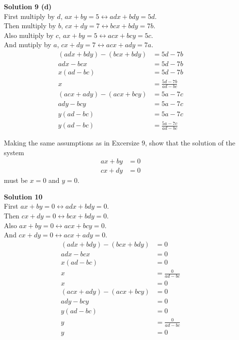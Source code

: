\textbf{Solution 9 (d)} \\
First multiply by $d$, $ax + by = 5 \leftrightarrow adx + bdy = 5d$. \\
Then multiply by $b$, $cx + dy = 7 \leftrightarrow bcx + bdy = 7b$. \\
Also multiply by $c$, $ax + by = 5 \leftrightarrow acx + bcy = 5c$. \\
And mutiply by $a$, $cx + dy  = 7 \leftrightarrow acx + ady = 7a$. 
\begin{align*}
    (adx + bdy) - (bcx + bdy) &= 5d - 7b && \\
    adx - bcx &= 5d - 7b && \\
    x(ad - bc) &= 5d - 7b && \\
    x &= \frac{5d - 7b}{ad - bc}
\end{align*}
\begin{align*}
    (acx + ady) - (acx + bcy) &= 5a - 7c && \\
    ady - bcy &= 5a - 7c && \\
    y(ad - bc) &= 5a - 7c && \\
    y(ad - bc) &= \frac{5a - 7c}{ad - bc} 
\end{align*}

\begin{tcolorbox}[title=Problem 10, breakable]
    Making the same assumptions as in Excersize $9$, show that the solution
    of the system
    \begin{align*}
        ax + by &= 0 && \\
        cx + dy &= 0
    \end{align*}
    must be $x = 0$ and $y = 0$.
\end{tcolorbox}

\textbf{Solution 10} \\
First $ax + by = 0 \leftrightarrow adx + bdy = 0$. \\
Then $cx + dy = 0 \leftrightarrow bcx + bdy = 0$. \\
Also $ax + by = 0 \leftrightarrow acx + bcy = 0$. \\
And $cx + dy = 0 \leftrightarrow acx + ady = 0$. 
\begin{align*}
    (adx + bdy) - (bcx + bdy) &= 0 && \\
    adx - bcx &= 0 && \\
    x(ad - bc) &= 0 && \\
    x &= \frac{0}{ad - bc} \\ 
    x &= 0
\end{align*}
\begin{align*}
    (acx + ady) - (acx + bcy) &= 0 && \\
    ady - bcy &= 0 && \\
    y(ad - bc) &= 0 && \\
    y &= \frac{0}{ad - bc} && \\
    y &= 0
\end{align*}

